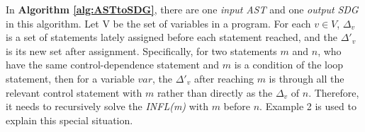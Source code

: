 
In \textbf{Algorithm \ref{alg:ASTtoSDG}}, there are one \emph{input} \emph{AST} and one \emph{output} \emph{SDG} in this algorithm.
Let V be the set of variables in a program. For each $v \in V$, $\Delta_{v}$ is a set of statements lately assigned before each statement reached, and the $\Delta'_{v}$ is its new set after assignment.
Specifically, for two statements $m$ and $n$, who have the same control-dependence statement and $m$ is a condition of the loop statement, then for a variable $var$, the $\Delta'_{v}$ after reaching $m$ is through all the relevant control statement with $m$ rather than directly as the $\Delta_{v}$ of $n$. Therefore, it needs to recursively solve the \emph{INFL(m)} with $m$ before $n$. Example 2 is used to explain this special situation.

